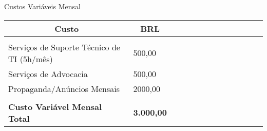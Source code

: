 \begin{enumerate}
    \begin{quadro}[H]
    \caption{Custos Variáveis Mensal}
    \label{custos-variaveis}
    	\centering\footnotesize
        \begin{tabular}{|p{0.50\linewidth} | p{0.11\linewidth} | p{0.2\linewidth} | p{0.35\linewidth} |}  \hline
        \multicolumn{1}{|c|}{\textbf{Custo}} &
          \multicolumn{1}{c|}{\textbf{BRL}} \\ \hline
          
                & \\ \hline

        Serviços de Suporte Técnico de TI (5h/mês) & 500,00           \\ \hline
        Serviços de Advocacia & 500,00                     \\ \hline
        Propaganda/Anúncios Mensais & 2000,00                \\\hline

        & \\ \hline
        {\textbf{Custo Variável Mensal Total}} & {\textbf{3.000,00}}\\ \hline        
        \end{tabular}
    \end{quadro}
\end{enumerate}